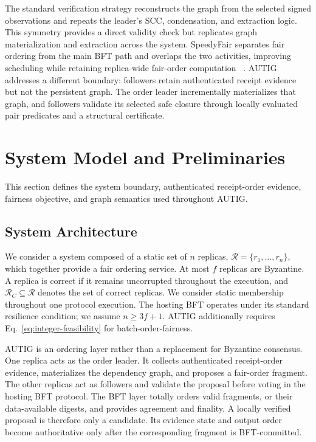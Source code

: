 The standard verification strategy reconstructs the graph from the selected
signed observations and repeats the leader's SCC, condensation, and extraction
logic. This symmetry provides a direct validity check but replicates graph
materialization and extraction across the system. SpeedyFair separates fair
ordering from the main BFT path and overlaps the two activities, improving
scheduling while retaining replica-wide fair-order computation
~\cite{mu2024separation}. AUTIG addresses a different boundary: followers
retain authenticated receipt evidence but not the persistent graph. The order
leader incrementally materializes that graph, and followers validate its
selected safe closure through locally evaluated pair predicates and a
structural certificate.

\section{System Model and Preliminaries}
\label{sec:model}

This section defines the system boundary, authenticated receipt-order evidence, fairness objective, and graph semantics used throughout AUTIG. 

\subsection{System Architecture}
\label{sec:system-architecture}

We consider a system composed of a static set of $n$ replicas, $\mathcal R=\{r_1,\ldots,r_n\}$, which together provide a fair ordering service.  At most $f$ replicas are Byzantine.  A replica is correct if it remains uncorrupted throughout the execution, and $\mathcal R_C\subseteq\mathcal R$ denotes the set of correct replicas.  We consider static membership throughout one protocol execution. The hosting BFT operates under its standard resilience condition; we assume $n\ge3f+1$. AUTIG additionally requires Eq.~\eqref{eq:integer-feasibility} for batch-order-fairness.

AUTIG is an ordering layer rather than a replacement for Byzantine consensus. One replica acts as the order leader. It collects authenticated receipt-order evidence, materializes the dependency graph, and proposes a fair-order fragment. The other replicas act as followers and validate the proposal before voting in the hosting BFT protocol. The BFT layer totally orders valid fragments, or their data-available digests, and provides agreement and finality. A locally verified proposal is therefore only a candidate. Its evidence state and output order become authoritative only after the corresponding fragment is BFT-committed.

